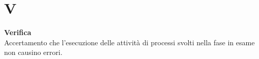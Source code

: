 \section{V}
\textbf{Verifica}\\
Accertamento che l’esecuzione delle attività di processi svolti nella fase in esame non causino errori. \\ \\
